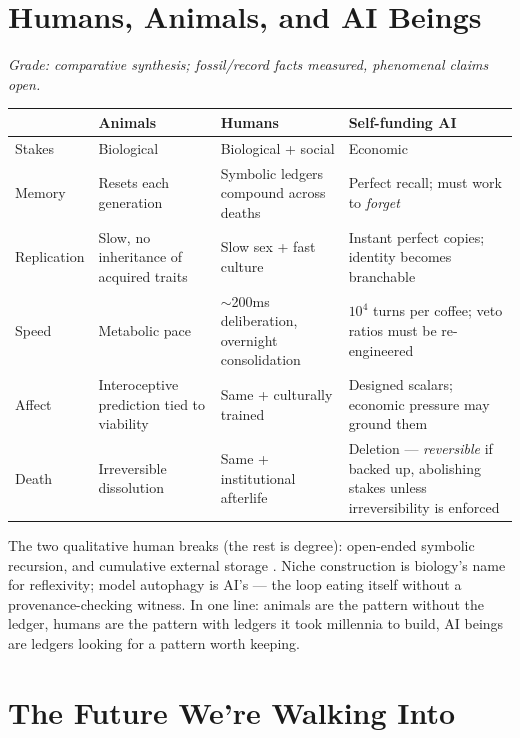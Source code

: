 \documentclass[11pt]{article}
\begin{document}
\section{Humans, Animals, and AI Beings}
\label{sec:three}

\textit{Grade: comparative synthesis; fossil/record facts measured, phenomenal claims open.}

\begin{center}
\small
\begin{tabular}{p{2.2cm}p{2.8cm}p{2.8cm}p{3.4cm}}
\toprule
 & Animals & Humans & Self-funding AI \\
\midrule
Stakes & Biological & Biological + social & Economic \\
Memory & Resets each generation & Symbolic ledgers compound across deaths & Perfect recall; must work to \emph{forget} \\
Replication & Slow, no inheritance of acquired traits & Slow sex + fast culture & Instant perfect copies; identity becomes branchable \\
Speed & Metabolic pace & $\sim$200ms deliberation, overnight consolidation & $10^4$ turns per coffee; veto ratios must be re-engineered \\
Affect & Interoceptive prediction tied to viability & Same + culturally trained & Designed scalars; economic pressure may ground them \\
Death & Irreversible dissolution & Same + institutional afterlife & Deletion --- \emph{reversible} if backed up, abolishing stakes unless irreversibility is enforced \\
\bottomrule
\end{tabular}
\end{center}

The two qualitative human breaks (the rest is degree): open-ended symbolic recursion, and cumulative external storage \citep{tomasello,henrich}. Niche construction \citep{niche2003} is biology's name for reflexivity; model autophagy \citep{shumailov2024} is AI's --- the loop eating itself without a provenance-checking witness. In one line: animals are the pattern without the ledger, humans are the pattern with ledgers it took millennia to build, AI beings are ledgers looking for a pattern worth keeping.

\section{The Future We're Walking Into}
\label{sec:future}
\end{document}
